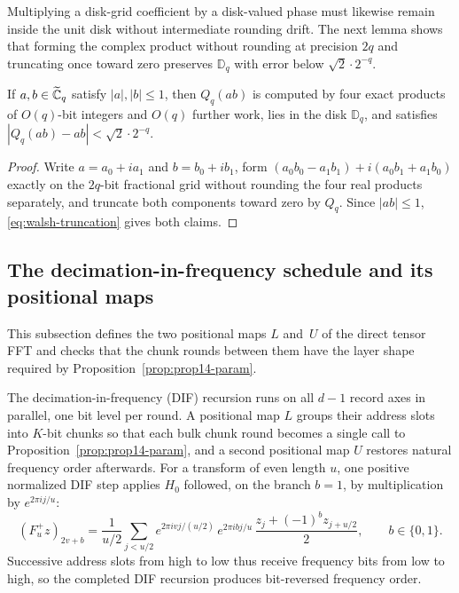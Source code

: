 Multiplying a disk-grid coefficient by a disk-valued phase must likewise remain inside the unit disk without
intermediate rounding drift. The next lemma shows that forming the complex product without rounding at precision $2q$
and truncating once toward zero preserves $\mathbb D_q$ with error below $\sqrt2\cdot 2^{-q}$.

\begin{lemma}\label{lem:disk-product}
If $a,b\in\widetilde{\mathbb{C}}_q$ satisfy $|a|,|b|\le1$, then $Q_q(ab)$ is computed by four exact products of $O(q)$-bit integers and
$O(q)$ further work, lies in the disk $\mathbb D_q$, and satisfies $|Q_q(ab)-ab|<\sqrt2\cdot2^{-q}$.
\end{lemma}

\begin{proof}
Write $a=a_0+ia_1$ and $b=b_0+ib_1$, form $(a_0b_0-a_1b_1)+i(a_0b_1+a_1b_0)$ exactly on the $2q$-bit fractional grid
without rounding the four real products separately, and truncate both components toward zero by $Q_q$. Since $|ab|\le1$,
\eqref{eq:walsh-truncation} gives both claims.
\end{proof}

\subsection{The decimation-in-frequency schedule and its positional maps}\label{sec:direct-fft-layout}

This subsection defines the two positional maps $L$ and~$U$ of the direct tensor FFT and checks that the chunk rounds
between them have the layer shape required by Proposition~\ref{prop:prop14-param}.

The decimation-in-frequency (DIF) recursion runs on all $d-1$ record axes in parallel, one bit level per round. A
positional map $L$ groups their address slots into $K$-bit chunks so that each bulk chunk round becomes a single call to
Proposition~\ref{prop:prop14-param}, and a second positional map $U$ restores natural frequency order afterwards. For a
transform of even length $u$, one positive normalized DIF step applies $H_0$ followed, on the branch $b=1$, by
multiplication by $e^{2\pi ij/u}$:
\begin{equation}\label{eq:dif}
  (F^+_uz)_{2v+b}=\frac{1}{u/2}\sum_{j<u/2}e^{2\pi ivj/(u/2)}\,e^{2\pi ibj/u}\,\frac{z_j+(-1)^bz_{j+u/2}}2,\qquad
  b\in\{0,1\}.
\end{equation}
Successive address slots from high to low thus receive frequency bits from low to high, so the completed DIF recursion
produces bit-reversed frequency order.

